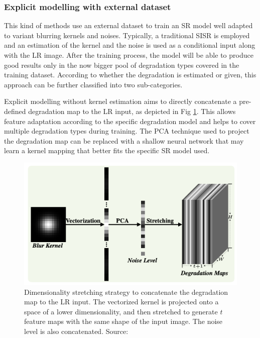         \subsubsection{Explicit modelling with external dataset}

        This kind of methods use an external dataset to train an SR model well adapted to  variant blurring kernels and noises. 
        Typically, a traditional SISR is employed and an estimation of the kernel and the noise is used as a conditional input along with the LR image.
        After the training process, the model will be able to produce good results only in the now bigger pool of degradation types covered in the training dataset.
        According to whether the degradation is estimated or given, this approach can be further classified into two sub-categories.


        Explicit modelling without kernel estimation aims to directly concatenate a pre-defined degradation map to the LR input, as depicted in Fig \ref{fig:2-external-dataset-stretching}. 
        This allows feature adaptation according to the specific degradation model and helps to cover multiple degradation types during training. 
        The PCA technique used to project the degradation map can be replaced with a shallow neural network that may learn a kernel mapping that better fits the specific SR model used.

        \begin{figure}[H]
            \centering
            \includegraphics[width=\textwidth]{Includes/2-external-dataset-stretching.png}
            \caption{Dimensionality stretching strategy to concatenate the degradation map to the LR input. 
                     The vectorized kernel is projected onto a space of a lower dimensionality, and then stretched to generate $t$ feature maps with the same shape of the input image.
                     The noise level is also concatenated. Source: \cite{zhang2018residual} }    
            \label{fig:2-external-dataset-stretching}
        \end{figure}

